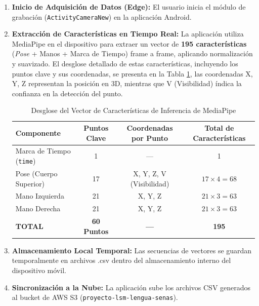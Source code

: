 \begin{enumerate}
    \item \textbf{Inicio de Adquisición de Datos (Edge):} El usuario inicia el módulo de grabación (\texttt{ActivityCameraNew}) en la aplicación Android.

    \item \textbf{Extracción de Características en Tiempo Real:} La aplicación utiliza MediaPipe en el dispositivo para extraer un vector de \textbf{195 características} (\textit{Pose} + Manos + Marca de Tiempo) frame a frame, aplicando normalización y suavizado. El desglose detallado de estas características, incluyendo los puntos clave y sus coordenadas, se presenta en la Tabla \ref{tab:mediapipe_features_styled}, las coordenadas X, Y, Z representan la posición en 3D, mientras que V (Visibilidad) índica la confianza en la detección del punto.

    \begin{table}[H]
        \centering
        \caption{Desglose del Vector de Características de Inferencia de MediaPipe}
        \label{tab:mediapipe_features_styled}
        \begin{tabular}{|l|c|c|c|}
            \hline
            \textbf{Componente} & \textbf{Puntos Clave} & \textbf{Coordenadas por Punto} & \textbf{Total de Características} \\
            \hline
            Marca de Tiempo (\texttt{time}) & 1 & --- & 1 \\
            \hline
            Pose (Cuerpo Superior) & 17 & X, Y, Z, V (Visibilidad) & $17 \times 4 = 68$ \\
            \hline
            Mano Izquierda & 21 & X, Y, Z & $21 \times 3 = 63$ \\
            \hline
            Mano Derecha & 21 & X, Y, Z & $21 \times 3 = 63$ \\
            \hline
            \textbf{TOTAL} & \textbf{60 Puntos} & \textbf{---} & \textbf{195} \\
            \hline
        \end{tabular}
        \vspace{0.5em}
        \footnotesize
    \end{table}
    \item \textbf{Almacenamiento Local Temporal:} Las secuencias de vectores se guardan temporalmente en archivos .csv dentro del almacenamiento interno del dispositivo móvil.

    \item \textbf{Sincronización a la Nube:} La aplicación sube los archivos CSV generados al bucket de AWS S3 (\texttt{proyecto-lsm-lengua-senas}).


\end{enumerate}
